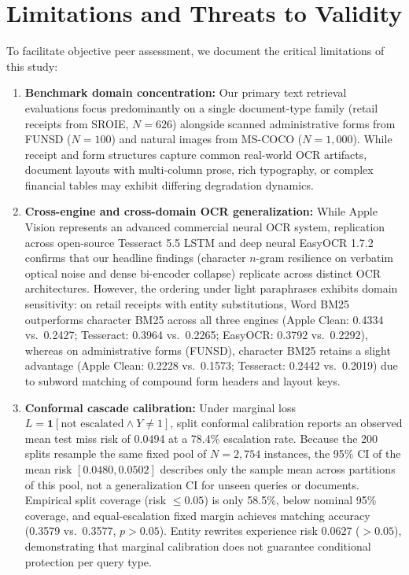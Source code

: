 \documentclass[conference]{IEEEtran}
\begin{document}
\section{Limitations and Threats to Validity}
\label{sec:limitations}
To facilitate objective peer assessment, we document the critical limitations of this study:
\begin{enumerate}
    \setlength{\itemsep}{0.2pt plus 0.1pt}
    \setlength{\parsep}{0pt}
    \setlength{\parskip}{0pt}
    \item \textbf{Benchmark domain concentration:} Our primary text retrieval evaluations focus predominantly on a single document-type family (retail receipts from SROIE, $N=626$) alongside scanned administrative forms from FUNSD ($N=100$) and natural images from MS-COCO ($N=1{,}000$). While receipt and form structures capture common real-world OCR artifacts, document layouts with multi-column prose, rich typography, or complex financial tables may exhibit differing degradation dynamics.
    \item \textbf{Cross-engine and cross-domain OCR generalization:} While Apple Vision represents an advanced commercial neural OCR system, replication across open-source Tesseract 5.5 LSTM and deep neural EasyOCR 1.7.2 confirms that our headline findings (character $n$-gram resilience on verbatim optical noise and dense bi-encoder collapse) replicate across distinct OCR architectures. However, the ordering under light paraphrases exhibits domain sensitivity: on retail receipts with entity substitutions, Word BM25 outperforms character BM25 across all three engines (Apple Clean: 0.4334 vs.\ 0.2427; Tesseract: 0.3964 vs.\ 0.2265; EasyOCR: 0.3792 vs.\ 0.2292), whereas on administrative forms (FUNSD), character BM25 retains a slight advantage (Apple Clean: 0.2228 vs.\ 0.1573; Tesseract: 0.2442 vs.\ 0.2019) due to subword matching of compound form headers and layout keys.
    \item \textbf{Conformal cascade calibration:} Under marginal loss $L = \mathbf{1}[\text{not escalated} \land Y \ne 1]$, split conformal calibration reports an observed mean test miss risk of 0.0494 at a 78.4\% escalation rate. Because the 200 splits resample the same fixed pool of $N=2{,}754$ instances, the 95\% CI of the mean risk $[0.0480, 0.0502]$ describes only the sample mean across partitions of this pool, not a generalization CI for unseen queries or documents. Empirical split coverage (risk $\le 0.05$) is only 58.5\%, below nominal 95\% coverage, and equal-escalation fixed margin achieves matching accuracy (0.3579 vs.\ 0.3577, $p > 0.05$). Entity rewrites experience risk 0.0627 ($> 0.05$), demonstrating that marginal calibration does not guarantee conditional protection per query type.

\end{enumerate}
\end{document}
